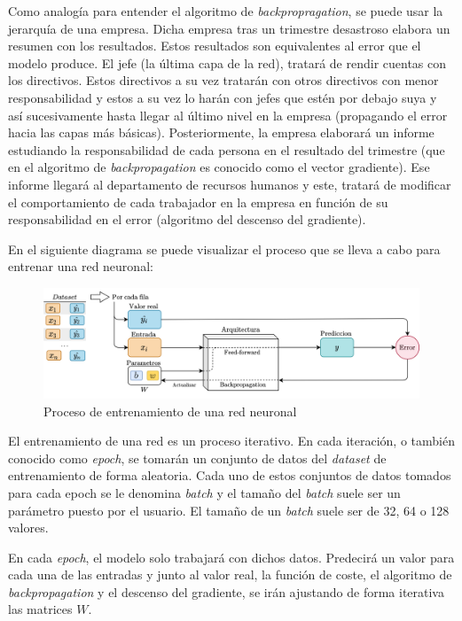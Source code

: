 \label{p:company_backpropagation}
Como analogía para entender el algoritmo de \textit{backpropragation}, se puede usar la jerarquía de una empresa. Dicha empresa tras un trimestre desastroso elabora un resumen con los resultados. Estos resultados son equivalentes al error que el modelo produce. El jefe (la última capa de la red), tratará de rendir cuentas con los directivos. Estos directivos a su vez tratarán con otros directivos con menor responsabilidad y estos a su vez lo harán con jefes que estén por debajo suya y así sucesivamente hasta llegar al último nivel en la empresa (propagando el error hacia las capas más básicas). Posteriormente, la empresa elaborará un informe estudiando la responsabilidad de cada persona en el resultado del trimestre (que en el algoritmo de \textit{backpropagation} es conocido como el vector gradiente). Ese informe llegará al departamento de recursos humanos y este, tratará de modificar el comportamiento de cada trabajador en la empresa en función de su responsabilidad en el error (algoritmo del descenso del gradiente).
\newline

En el siguiente diagrama se puede visualizar el proceso que se lleva a cabo para entrenar una red neuronal: 
\begin{figure}[H]
    \centering
    \includegraphics[width=15cm]{images/state-of-art/training/training.png}
    \caption{Proceso de entrenamiento de una red neuronal}
    \label{fig:error_regression}
\end{figure}

El entrenamiento de una red es un proceso iterativo. En cada iteración, o también conocido como \textit{epoch}, se tomarán un conjunto de datos del \textit{dataset} de entrenamiento de forma aleatoria. Cada uno de estos conjuntos de datos tomados para cada epoch se le denomina \textit{batch} y el tamaño del \textit{batch} suele ser un parámetro puesto por el usuario. El tamaño de un \textit{batch} suele ser de 32, 64 o 128 valores.
\newline

En cada \textit{epoch}, el modelo solo trabajará con dichos datos. Predecirá un valor para cada una de las entradas y junto al valor real, la función de coste, el algoritmo de \textit{backpropagation} y el descenso del gradiente, se irán ajustando de forma iterativa las matrices $W$.
